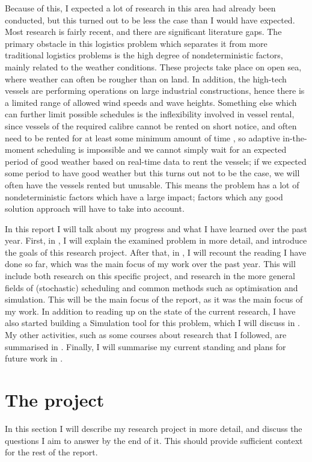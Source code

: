 \documentclass[a4paper,12pt]{article}
\begin{document}
Because of this, I expected a lot of research in this area had already been conducted, but this turned out to be less the case than I would have expected. Most research is fairly recent, and there are significant literature gaps. The primary obstacle in this logistics problem which separates it from more traditional logistics problems is the high degree of nondeterministic factors, mainly related to the weather conditions. These projects take place on open sea, where weather can often be rougher than on land. In addition, the high-tech vessels are performing operations on large industrial constructions, hence there is a limited range of allowed wind speeds and wave heights. Something else which can further limit possible schedules is the inflexibility involved in vessel rental, since vessels of the required calibre cannot be rented on short notice, and often need to be rented for at least some minimum amount of time \cite{kerkhove2017optimised}, so adaptive in-the-moment scheduling is impossible and we cannot simply wait for an expected period of good weather based on real-time data to rent the vessels; if we expected some period to have good weather but this turns out not to be the case, we will often have the vessels rented but unusable. This means the problem has a lot of nondeterministic factors which have a large impact; factors which any good solution approach will have to take into account. 

In this report I will talk about my progress and what I have learned over the past year. First, in , I will explain the examined problem in more detail, and introduce the goals of this research project. After that, in , I will recount the reading I have done so far, which was the main focus of my work over the past year. This will include both research on this specific project, and research in the more general fields of (stochastic) scheduling and common methods such as optimisation and simulation. This will be the main focus of the report, as it was the main focus of my work. In addition to reading up on the state of the current research, I have also started building a Simulation tool for this problem, which I will discuss in . My other activities, such as some courses about research that I followed, are summarised in . Finally, I will summarise my current standing and plans for future work in . 

\pagebreak

\section{The project} \label{s:project}
In this section I will describe my research project in more detail, and discuss the questions I aim to answer by the end of it. This should provide sufficient context for the rest of the report. 
\end{document}

